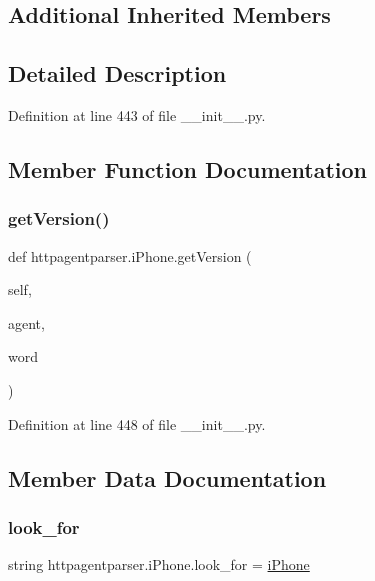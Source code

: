 \subsection*{Additional Inherited Members}


\subsection{Detailed Description}


Definition at line 443 of file \+\_\+\+\_\+init\+\_\+\+\_\+.\+py.



\subsection{Member Function Documentation}
\hypertarget{classhttpagentparser_1_1i_phone_a74316e075aa19f5a81efa5a583701ad9}{}\label{classhttpagentparser_1_1i_phone_a74316e075aa19f5a81efa5a583701ad9} 
\subsubsection{\texorpdfstring{get\+Version()}{getVersion()}}
{\footnotesize\ttfamily def httpagentparser.\+i\+Phone.\+get\+Version (\begin{DoxyParamCaption}\item[{}]{self,  }\item[{}]{agent,  }\item[{}]{word }\end{DoxyParamCaption})}



Definition at line 448 of file \+\_\+\+\_\+init\+\_\+\+\_\+.\+py.



\subsection{Member Data Documentation}
\hypertarget{classhttpagentparser_1_1i_phone_a4804fa8dc4448a6a7fa660366a488473}{}\label{classhttpagentparser_1_1i_phone_a4804fa8dc4448a6a7fa660366a488473} 
\subsubsection{\texorpdfstring{look\+\_\+for}{look\_for}}
{\footnotesize\ttfamily string httpagentparser.\+i\+Phone.\+look\+\_\+for = \textquotesingle{}\hyperlink{classhttpagentparser_1_1i_phone}{i\+Phone}\textquotesingle{}\hspace{0.3cm}{\ttfamily [static]}}



